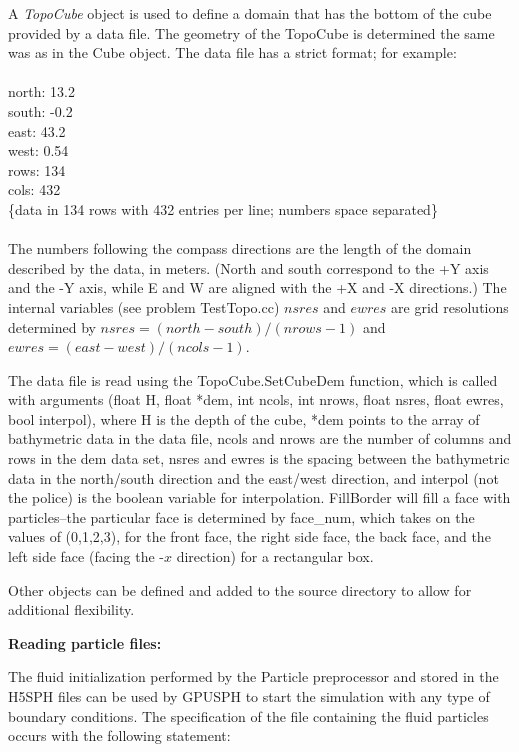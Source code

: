 \documentclass{../GPUSPHtemplate}
\begin{document}
A {\em TopoCube} object is used to define a domain that has the bottom
of the cube provided by a data file. The geometry of the TopoCube is
determined the same was as in the Cube object. The data file has a
strict format; for example: \\\\ north: 13.2 \\ south: -0.2\\ east:
43.2 \\ west: 0.54 \\ rows: 134\\ cols: 432 \\ \{data in 134 rows
with 432 entries per line; numbers space separated\}\\ \\ The numbers
following the compass directions are the length of the domain described
by the data, in meters. (North and south correspond to the +Y axis and
the -Y axis, while E and W are aligned with the +X and -X directions.)
The internal variables (see problem TestTopo.cc) $nsres$ and $ewres$ are
grid resolutions determined by $nsres= (north-south)/(nrows-1)$ and
$ewres= (east -west)/(ncols-1)$.

The data file is read using the TopoCube.SetCubeDem function, which is
called with arguments (float H, float *dem, int ncols, int nrows, float
nsres, float ewres, bool interpol), where H is the depth of the cube,
*dem points to the array of bathymetric data in the data file, ncols and
nrows are the number of columns and rows in the dem data set, nsres and
ewres is the spacing between the bathymetric data in the north/south
direction and the east/west direction, and interpol (not the police) is
the boolean variable for interpolation. FillBorder will fill a face
with particles--the particular face is determined by face\_num, which
takes on the values of (0,1,2,3), for the front face, the right side
face, the back face, and the left side face (facing the -$x$ direction)
for a rectangular box.

Other objects can be defined and added to the source directory to allow
for additional flexibility.

\textbf{Reading particle files:}

The fluid initialization performed by the Particle preprocessor and stored in the H5SPH 
files can be used by GPUSPH to start the simulation with any type of boundary conditions.
The specification of the file containing the fluid particles occurs with the following statement:
\end{document}
